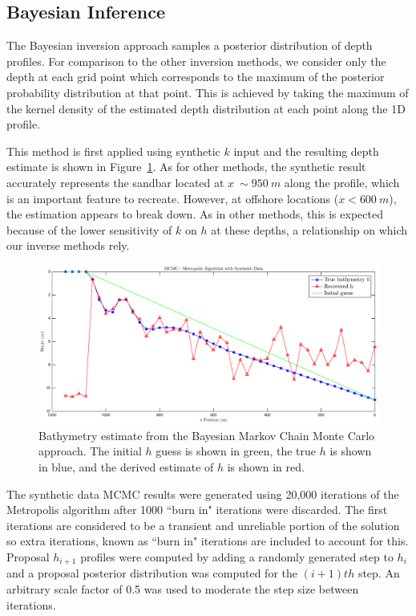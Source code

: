 \subsection{Bayesian Inference}
The Bayesian inversion approach samples a posterior distribution of depth profiles. For comparison to the other inversion methods, we consider only the depth at each grid point which corresponds to the maximum of the posterior probability distribution at that point. This is achieved by taking the maximum of the kernel density of the estimated depth distribution at each point along the 1D profile. 

This method is first applied using synthetic $k$ input and the resulting depth estimate is shown in Figure~\ref{mcmc-synthetic}. As for other methods, the synthetic result accurately represents the sandbar located at $x~\sim950~m$ along the profile, which is an important feature to recreate. However, at offshore locations ($x<600~m$), the estimation appears to break down. As in other methods, this is expected because of the lower sensitivity of $k$ on $h$ at these depths, a relationship on which our inverse methods rely.

\begin{figure}[H]
\center
\includegraphics[scale=0.46]{img/MCMC-manufactured.eps} 
\caption{Bathymetry estimate from the Bayesian Markov Chain Monte Carlo approach. The initial $h$ guess is shown in green, the true $h$ is shown in blue, and the derived estimate of $h$ is shown in red.}
\label{mcmc-synthetic}
\end{figure}

The synthetic data MCMC results were generated using 20,000 iterations of the Metropolis algorithm after 1000 ``burn in" iterations were discarded. The first iterations are considered to be a transient and unreliable portion of the solution so extra iterations, known as ``burn in" iterations are included to account for this. Proposal $h_{i+1}$ profiles were computed by adding a randomly generated step to $h_i$ and a proposal posterior distribution was computed for the $(i+1)th$ step. An arbitrary scale factor of 0.5 was used to moderate the step size between iterations. 

